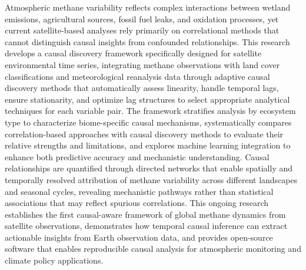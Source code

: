 \acresetall

Atmospheric methane variability reflects complex interactions between wetland emissions, agricultural sources, fossil fuel leaks, and oxidation processes, yet current satellite-based analyses rely primarily on correlational methods that cannot distinguish causal insights from confounded relationships. This research develops a causal discovery framework specifically designed for satellite environmental time series, integrating methane observations with land cover classifications and meteorological reanalysis data through adaptive causal discovery methods that automatically assess linearity, handle temporal lags, ensure stationarity, and optimize lag structures to select appropriate analytical techniques for each variable pair. The framework stratifies analysis by ecosystem type to characterize biome-specific causal mechanisms, systematically compares correlation-based approaches with causal discovery methods to evaluate their relative strengths and limitations, and explores machine learning integration to enhance both predictive accuracy and mechanistic understanding. Causal relationships are quantified through directed networks that enable spatially and temporally resolved attribution of methane variability across different landscapes and seasonal cycles, revealing mechanistic pathways rather than statistical associations that may reflect spurious correlations. This ongoing research establishes the first causal-aware framework of global methane dynamics from satellite observations, demonstrates how temporal causal inference can extract actionable insights from Earth observation data, and provides open-source software that enables reproducible causal analysis for atmospheric monitoring and climate policy applications.
